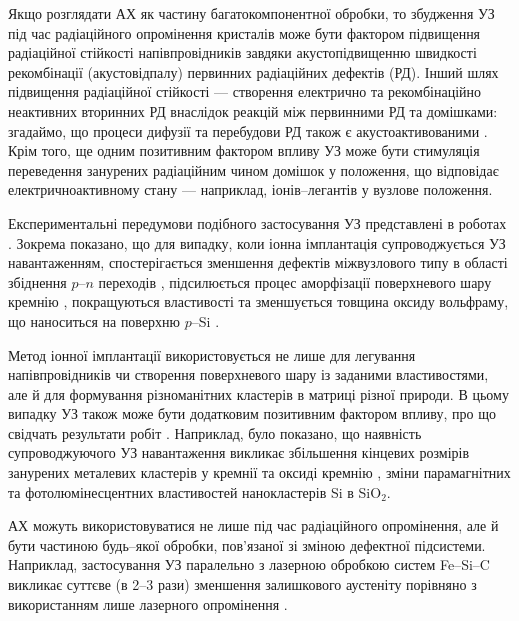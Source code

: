 Якщо розглядати АХ як частину багатокомпонентної обробки, то збудження УЗ під час радіаційного опромінення кристалів може бути фактором підвищення радіаційної стійкості напівпровідників завдяки акустопідвищенню швидкості рекомбінації (акустовідпалу) первинних радіаційних дефектів (РД).
Інший шлях підвищення радіаційної стійкості --- створення електрично та рекомбінаційно неактивних вторинних РД внаслідок реакцій між первинними РД та домішками: згадаймо, що процеси дифузії та перебудови РД також є акустоактивованими \cite{YOlikh2006TPLr,Parchinskii2000r}.
Крім того, ще одним позитивним фактором впливу УЗ може бути стимуляція переведення занурених радіаційним чином домішок у положення, що відповідає електричноактивному стану --- наприклад, іонів--легантів у вузлове положення.

Експериментальні передумови подібного застосування УЗ представлені в роботах \cite{YOlikh2005,RomanyukSST,ROMANYUK2005}.
Зокрема показано, що для випадку, коли іонна імплантація супроводжується УЗ навантаженням, спостерігається зменшення дефектів міжвузлового типу в області збіднення $p$--$n$ переходів \cite{YOlikh2005},
підсилюється процес аморфізації поверхневого шару кремнію \cite{RomanyukSST},
покращуються властивості та зменшується товщина оксиду вольфраму, що наноситься на поверхню $p$--Si \cite{ROMANYUK2005}.

Метод іонної імплантації використовується не лише для легування напівпровідників чи створення поверхневого шару із заданими властивостями, але й для формування різноманітних кластерів в матриці різної природи.
В цьому випадку УЗ також може бути додатковим позитивним фактором впливу, про що свідчать результати робіт \cite{Roman:2006JAP,Roman:2007APL,Roman:2010JAP,YOlikh2010JL}.
Наприклад, було показано, що наявність супроводжуючого УЗ навантаження викликає збільшення кінцевих розмірів занурених металевих кластерів у кремнії \cite{Roman:2006JAP} та оксиді кремнію \cite{Roman:2007APL}, зміни парамагнітних \cite{Roman:2010JAP} та фотолюмінесцентних \cite{YOlikh2010JL}властивостей нанокластерів Si в SiO$_2$.

АХ можуть використовуватися не лише під час радіаційного опромінення, але й бути частиною будь--якої обробки, пов'язаної зі зміною дефектної підсистеми.
Наприклад, застосування УЗ паралельно з лазерною обробкою систем Fe--Si--C викликає суттєве (в 2--3 рази) зменшення залишкового аустеніту порівняно з використанням лише лазерного опромінення \cite{US:FeSiC}.


